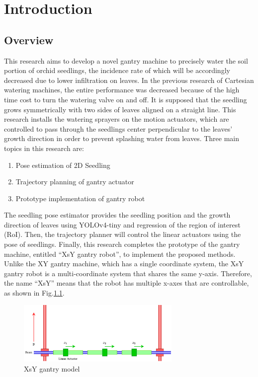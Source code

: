 \chapter{Introduction}
\label{c:introduction}

\section{Overview}
\label{section:overview}

This research aims to develop a novel gantry machine to precisely water the soil portion of orchid seedlings, the incidence rate of which will be accordingly decreased due to lower infiltration on leaves. In the previous research of Cartesian watering machines, the entire performance was decreased because of the high time cost to turn the watering valve on and off. It is supposed that the seedling grows symmetrically with two sides of leaves aligned on a straight line. This research installs the watering sprayers on the motion actuators, which are controlled to pass through the seedlings center perpendicular to the leaves' growth direction in order to prevent splashing water from leaves. Three main topics in this research are:

\begin{enumerate}
    \item Pose estimation of 2D Seedling
    \item Trajectory planning of gantry actuator
    \item Prototype implementation of gantry robot 
\end{enumerate}

The seedling pose estimator provides the seedling position and the growth direction of leaves using YOLOv4-tiny and regression of the region of interest (RoI). Then, the trajectory planner will control the linear actuators using the pose of seedlings. Finally, this research completes the prototype of the gantry machine, entitled ``XsY gantry robot'', to implement the proposed methods. Unlike the XY gantry machine, which has a single coordinate system, the XsY gantry robot is a multi-coordinate system that shares the same y-axis. Therefore, the name ``XsY'' means that the robot has multiple x-axes that are controllable, as shown in Fig.\ref{fig:xsymodel}.

\begin{figure}[ht]
    \centering
    \includegraphics[width=0.7\textwidth]{figsrc/ch01/XsY Gantry.png}
    \caption{XsY gantry model}
    \label{fig:xsymodel}
\end{figure}


